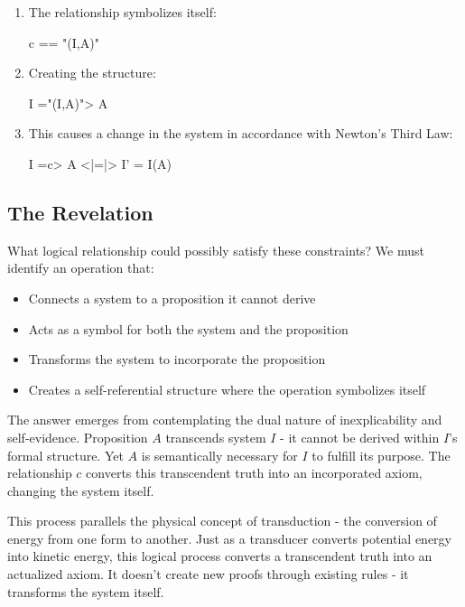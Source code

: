 \documentclass[runningheads]{llncs}
\begin{document}
\begin{enumerate}
    \item The relationship symbolizes itself: 
    
    \begin{center}
    c == "(I,A)"
    \end{center}
    
    \item Creating the structure: 
    
    \begin{center}
    I ="(I,A)"> A
    \end{center}
    
    \item This causes a change in the system in accordance with Newton's Third Law: 
    
    \begin{center}
    I =c> A <|=|> I' = I(A)
    \end{center}
\end{enumerate}

\subsection{The Revelation}

What logical relationship could possibly satisfy these constraints? We must identify an operation that:

\begin{itemize}
    \item Connects a system to a proposition it cannot derive
    \item Acts as a symbol for both the system and the proposition
    \item Transforms the system to incorporate the proposition
    \item Creates a self-referential structure where the operation symbolizes itself
\end{itemize}

The answer emerges from contemplating the dual nature of inexplicability and self-evidence. Proposition $A$ transcends system $I$ - it cannot be derived within $I$'s formal structure. Yet $A$ is semantically necessary for $I$ to fulfill its purpose. The relationship $c$ converts this transcendent truth into an incorporated axiom, changing the system itself.

This process parallels the physical concept of transduction - the conversion of energy from one form to another. Just as a transducer converts potential energy into kinetic energy, this logical process converts a transcendent truth into an actualized axiom. It doesn't create new proofs through existing rules - it transforms the system itself.
\end{document}
